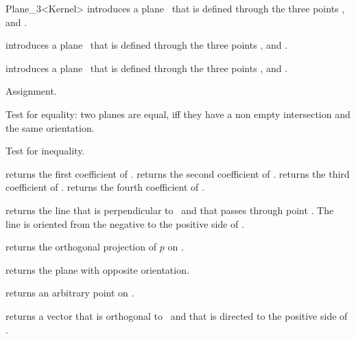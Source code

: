 \begin{ccRefClass} {Plane_3<Kernel>}
{introduces a plane \ccVar\ that is defined through the  three points 
 ,  and .}

{introduces a plane \ccVar\ that is defined through the  three points 
 ,  and .}

{introduces a plane \ccVar\ that is defined through the  three points 
 ,  and .}

\ccOperations
\ccHidden {}
        {Assignment.}

       {Test for equality: two planes are equal, iff they have a non 
        empty intersection and the same orientation.}

       {Test for inequality.}

       {returns the first coefficient of \ccVar.}
\ccGlue
{}
       {returns the second coefficient of \ccVar.}
\ccGlue
{}
       {returns the third coefficient of \ccVar.}
\ccGlue
{}
       {returns the fourth coefficient of \ccVar.}

       {returns the line that is perpendicular to \ccVar\ and that
        passes through point . The line is oriented from
        the negative to the positive side of \ccVar.}

       {returns the orthogonal projection of $p$ on \ccVar.}

       {returns the plane with opposite orientation.}

       {returns an arbitrary point on \ccVar.}

       {returns a vector that is orthogonal to \ccVar\ and that
        is directed to the positive side of \ccVar.}


\end{ccRefClass}
